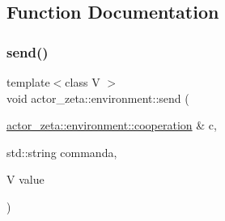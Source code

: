 \subsection{Function Documentation}
\mbox{\label{namespaceactor__zeta_1_1environment_a6c3d077fd8465f07c9bccc3e0a19ba14}} 
\subsubsection{\texorpdfstring{send()}{send()}}
{\footnotesize\ttfamily template$<$class V $>$ \\
void actor\+\_\+zeta\+::environment\+::send (\begin{DoxyParamCaption}\item[{\hyperlink{classactor__zeta_1_1environment_1_1cooperation}{actor\+\_\+zeta\+::environment\+::cooperation} \&}]{c,  }\item[{std\+::string}]{commanda,  }\item[{V}]{value }\end{DoxyParamCaption})\hspace{0.3cm}{\ttfamily [inline]}}

